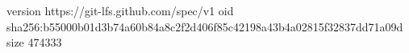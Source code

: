 version https://git-lfs.github.com/spec/v1
oid sha256:b55000b01d3b74a60b84a8c2f2d406f85c42198a43b4a02815f32837dd71a09d
size 474333
